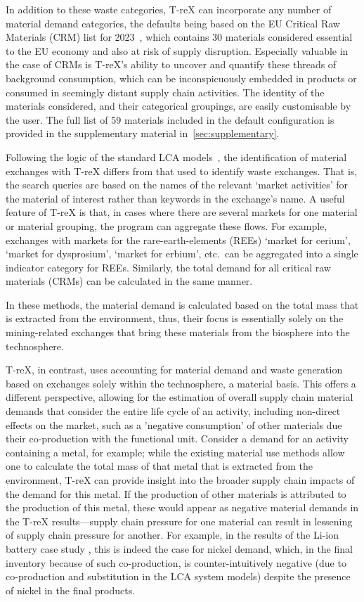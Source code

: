 \documentclass[a4paper,fleqn]{cas-dc}
\begin{document}
In addition to these waste categories, T-reX can incorporate any number of
material demand categories, the defaults being based on the EU Critical Raw
Materials (CRM) list for 2023~\citep{eu2023crmstudy}, which contains 30
materials considered essential to the EU economy and also at risk of supply
disruption. Especially valuable in the case of CRMs is T-reX's ability to
uncover and quantify these threads of background consumption, which can be
inconspicuously embedded in products or consumed in seemingly distant supply
chain activities. The identity of the materials considered, and their
categorical groupings, are easily customisable by the user. The full list of 59
materials included in the default configuration is provided in the
supplementary material in~\autoref{sec:supplementary}.

Following the logic of the standard LCA models~\cite{ecoinvent2016version3,
	guinee2004economicallocation}, the identification of material exchanges with
T-reX differs from that used to identify waste exchanges. That is, the search
queries are based on the names of the relevant `market activities' for the
material of interest rather than keywords in the exchange's name. A useful
feature of T-reX is that, in cases where there are several markets for one
material or material grouping, the program can aggregate these flows. For
example, exchanges with markets for the rare-earth-elements (REEs) `market for
cerium', `market for dysprosium', `market for erbium', etc.\ can be aggregated
into a single indicator category for REEs. Similarly, the total demand for all
critical raw materials (CRMs) can be calculated in the same manner.

In these methods, the material demand is calculated based on the total mass
that is extracted from the environment, thus, their focus is essentially solely
on the mining-related exchanges that bring these materials from the biosphere
into the technosphere.

T-reX, in contrast, uses accounting for material demand and waste generation
based on exchanges solely within the technosphere, a material basis. This
offers a different perspective, allowing for the estimation of overall supply
chain material demands that consider the entire life cycle of an activity,
including non-direct effects on the market, such as a 'negative consumption' of
other materials due their co-production with the functional unit. Consider a
demand for an activity containing a metal, for example; while the existing
material use methods allow one to calculate the total mass of that metal that
is extracted from the environment, T-reX can provide insight into the broader
supply chain impacts of the demand for this metal. If the production of other
materials is attributed to the production of this metal, these would appear as
negative material demands in the T-reX results---supply chain pressure for one
material can result in lessening of supply chain pressure for another. For
example, in the results of the Li-ion battery case study , this is indeed the
case for nickel demand, which, in the final inventory because of such
co-production, is counter-intuitively negative (due to co-production and
substitution in the LCA system models) despite the presence of nickel in the
final products.
\end{document}
